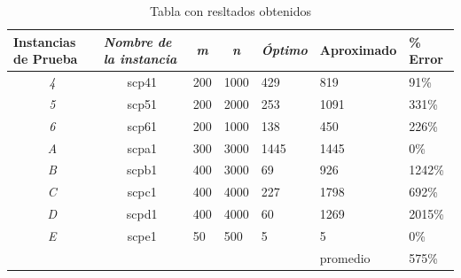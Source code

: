 \documentclass[12pt,a4paper]{article}
\begin{document}
\begin{table}[h]
\centering

\begin{tabular}{cclll|l|l|} 
\hline
\multicolumn{1}{|l|}{\textbf{Instancias de Prueba}} & \multicolumn{1}{l|}{\textit{Nombre de la instancia}} & \multicolumn{1}{c|}{\textit{m}} & \multicolumn{1}{c|}{\textit{n}} & \textit{Óptimo} & Aproximado & \% Error  \\ \hline
\multicolumn{1}{|c|}{\textit{4}}                    & \multicolumn{1}{c|}{scp41}                           & \multicolumn{1}{l|}{200}        & \multicolumn{1}{l|}{1000}       & 429             & 819        & 91\%     \\ \hline
\multicolumn{1}{|c|}{\textit{5}}                    & \multicolumn{1}{c|}{scp51}                           & \multicolumn{1}{l|}{200}        & \multicolumn{1}{l|}{2000}       & 253             & 1091       & 331\%    \\ \hline
\multicolumn{1}{|c|}{\textit{6}}                    & \multicolumn{1}{c|}{scp61}                           & \multicolumn{1}{l|}{200}        & \multicolumn{1}{l|}{1000}       & 138             & 450        & 226\%    \\ \hline
\multicolumn{1}{|c|}{\textit{A}}                    & \multicolumn{1}{c|}{scpa1}                           & \multicolumn{1}{l|}{300}        & \multicolumn{1}{l|}{3000}       & 1445            & 1445       & 0\%      \\ \hline
\multicolumn{1}{|c|}{\textit{B}}                    & \multicolumn{1}{c|}{scpb1}                           & \multicolumn{1}{l|}{400}        & \multicolumn{1}{l|}{3000}       & 69              & 926        & 1242\%   \\ \hline
\multicolumn{1}{|c|}{\textit{C}}                    & \multicolumn{1}{c|}{scpc1}                           & \multicolumn{1}{l|}{400}        & \multicolumn{1}{l|}{4000}       & 227             & 1798       & 692\%    \\ \hline
\multicolumn{1}{|c|}{\textit{D}}                    & \multicolumn{1}{c|}{scpd1}                           & \multicolumn{1}{l|}{400}        & \multicolumn{1}{l|}{4000}       & 60              & 1269       & 2015\%   \\ \hline
\multicolumn{1}{|c|}{\textit{E}}                    & \multicolumn{1}{c|}{scpe1}                           & \multicolumn{1}{l|}{50}         & \multicolumn{1}{l|}{500}        & 5               & 5          & 0\%      \\ \hline
\multicolumn{1}{l}{}                                & \multicolumn{1}{l}{}                                 &                                 &                                 &                 & promedio   & 575\%    \\ \cline{6-7} 
\end{tabular}
\label{tabla2}
\caption{Tabla con resltados obtenidos}
\end{table}
 
\end{document}
